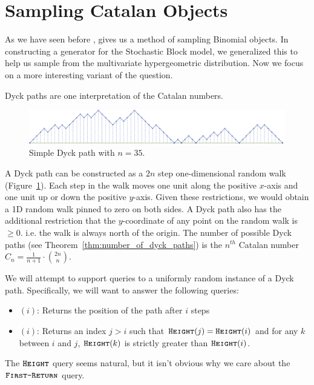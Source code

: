 \section{Sampling Catalan Objects}%
\label{sec:catalan_objects}

As we have seen before , \cite{huge} gives us a method of sampling Binomial objects.
In constructing a generator for the Stochastic Block model, we generalized this to help us sample from the multivariate hypergeometric distribution.
Now we focus on a more interesting variant of the question.

Dyck paths are one interpretation of the Catalan numbers.

\begin{figure}[htbp]
    \centering
    \includegraphics[width=\textwidth]{images/basic_dyck_path.pdf}
    \caption{Simple Dyck path with $n = 35$.}
    \label{fig:basic_dyck}
\end{figure}

A Dyck path can be constructed as a $2n$ step one-dimensional random walk (Figure~\ref{fig:basic_dyck}).
Each step in the walk moves one unit along the positive $x$-axis and one unit up or down the positive $y$-axis.
Given these restrictions, we would obtain a 1D random walk pinned to zero  on both sides.
A Dyck path also has the additional restriction that the $y$-coordinate of any point on the random walk is $\ge 0$.
i.e. the walk is always north of the origin.
The number of possible Dyck paths (see Theorem~\ref{thm:number_of_dyck_paths}) is the $n^{th}$ Catalan number $C_n=\frac{1}{n+1}\cdot{2n\choose n}$.

We will attempt to support queries to a uniformly random instance of a Dyck path.
Specifically, we will want to answer the following queries:
\begin{itemize}
    \item {}$(i)$: Returns the position of the path after $i$ steps
    \item {}$(i)$: Returns an index $j>i$ such that $\texttt{\textsc{Height}}(j)=\texttt{\textsc{Height}}(i)$ and for any $k$ between $i$ and $j$,
    $\texttt{\textsc{Height}}(k)$ is strictly greater than $\texttt{\textsc{Height}}(i)$.
\end{itemize}
The $\texttt{\textsc{Height}}$ query seems natural, but it isn't obvious why we care about the $\texttt{\textsc{First-Return}}$ query.


